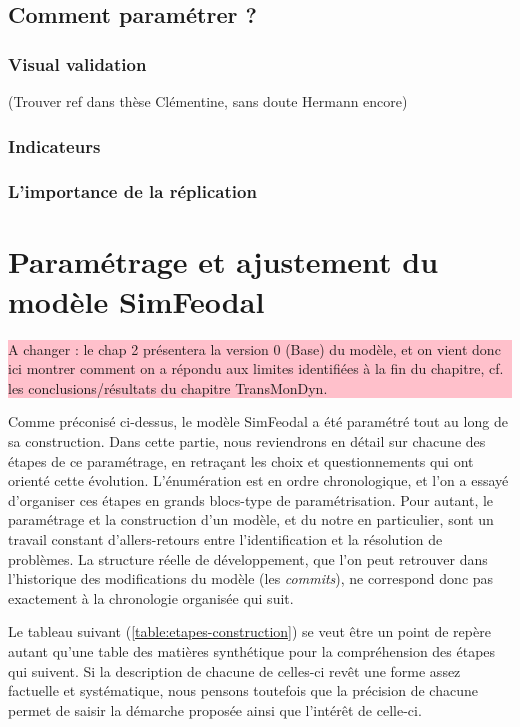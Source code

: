 \documentclass[12pt, a4paper, oneside]{book}
\begin{document}
	
	\subsection{Comment paramétrer ?}
	
	
	
	
	
	\subsubsection{Visual validation}
	
	(Trouver ref dans thèse Clémentine, sans doute Hermann encore)
	
	\subsubsection{Indicateurs}
	
	\subsubsection{L'importance de la réplication}
	
	
	\section{Paramétrage et ajustement du modèle SimFeodal}
	
	\colorbox{pink}{\parbox{0.9\textwidth}{%
			\vskip5pt
			A changer : le chap 2 présentera la version 0 (Base) du modèle, et on vient donc ici montrer comment on a répondu aux limites identifiées à la fin du chapitre, cf. les conclusions/résultats du chapitre TransMonDyn.
			\vskip5pt
		}
	}
	
	Comme préconisé ci-dessus, le modèle SimFeodal a été paramétré tout au long de sa construction. Dans cette partie, nous reviendrons en détail sur chacune des étapes de ce paramétrage, en retraçant les choix et questionnements qui ont orienté cette évolution. L'énumération est en ordre chronologique, et l'on a essayé d'organiser ces étapes en grands blocs-type de paramétrisation. Pour autant, le paramétrage et la construction d'un modèle, et du notre en particulier, sont un travail constant d'allers-retours entre l'identification et la résolution de problèmes. La structure réelle de développement, que l'on peut retrouver dans l'historique des modifications du modèle (les \og \textit{commits}\fg{}), ne correspond donc pas exactement à la chronologie organisée qui suit.
	
	Le tableau suivant (\cref{table:etapes-construction}) se veut être un point de repère autant qu'une table des matières synthétique pour la compréhension des étapes qui suivent. Si la description de chacune de celles-ci revêt une forme assez factuelle et systématique, nous pensons toutefois que la précision de chacune permet de saisir la démarche proposée ainsi que l'intérêt de celle-ci.
	
\end{document}
